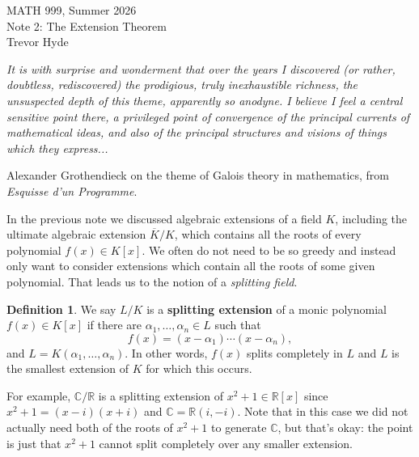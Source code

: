\documentclass[11pt]{article}
\def\RR{\mathbb{R}}
\def\CC{\mathbb{C}}
\theoremstyle{definition}
\newtheorem{definition}[theorem]{Definition}
\numberwithin{equation}{subsection}
\newcommand{\head}[1]{
	\begin{center}
		{\large #1}
		\vspace{.05 in}
	\end{center}
	\bigskip 
}
\begin{document}
\pagestyle{plain}

\setcounter{section}{2}   

\head{MATH 999, Summer 2026\\ Note 2: The Extension Theorem\\
Trevor Hyde}


\begin{center}
   \emph{It is with surprise and wonderment that over the years I discovered (or rather, doubtless, rediscovered) the prodigious, truly inexhaustible richness, the unsuspected depth of this theme, apparently so anodyne. 
   I believe I feel a central sensitive point there, a privileged point of convergence of the principal currents of mathematical ideas, and also of the principal structures and visions of things which they express...}\\
   \vspace{.1in}
   
   Alexander Grothendieck on the theme of Galois theory in mathematics, from \emph{Esquisse d'un Programme}.
\end{center}
\vspace{.1in}

In the previous note we discussed algebraic extensions of a field $K$, including the ultimate algebraic extension $\overline{K}/K$, which contains all the roots of every polynomial $f(x) \in K[x]$.
We often do not need to be so greedy and instead only want to consider extensions which contain all the roots of some given polynomial.
That leads us to the notion of a \emph{splitting field}.

\begin{definition}
    We say $L/K$ is a \textbf{splitting extension} of a monic polynomial $f(x) \in K[x]$ if there are $\alpha_1,\ldots, \alpha_n \in L$ such that
    \[
        f(x) = (x - \alpha_1)\cdots (x - \alpha_n),
    \]
    and $L = K(\alpha_1,\ldots, \alpha_n)$.
    In other words, $f(x)$ splits completely in $L$ and $L$ is the smallest extension of $K$ for which this occurs.
\end{definition}

For example, $\CC/\RR$ is a splitting extension of $x^2 +1 \in \RR[x]$ since $x^2 + 1 = (x - i)(x + i)$ and $\CC = \RR(i, -i)$.
Note that in this case we did not actually need both of the roots of $x^2 + 1$ to generate $\CC$, but that's okay: the point is just that $x^2 + 1$ cannot split completely over any smaller extension.
\end{document}
